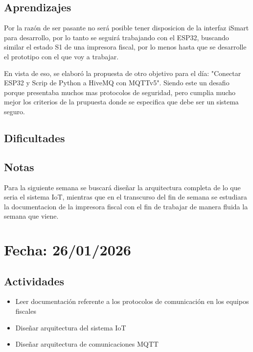 \documentclass[12pt, a4paper]{article}
\begin{document}
    \subsection*{Aprendizajes}

    Por la razón de ser pasante no será posible tener disposicion de la interfaz iSmart para desarrollo, por lo tanto se seguirá trabajando con el ESP32, buscando similar el estado S1 de una impresora fiscal, por lo menos hasta que se desarrolle el prototipo con el que voy a trabajar.

    En vista de eso, se elaboró la propuesta de otro objetivo para el día: "Conectar ESP32 y Scrip de Python a HiveMQ con MQTTv5". Siendo este un desafio porque presentaba muchos mas protocolos de seguridad, pero cumplia mucho mejor los criterios de la prupuesta donde se especifica que debe ser un sistema seguro.

    \subsection*{Dificultades}

    \subsection*{Notas}

    Para la siguiente semana se buscará diseñar la arquitectura completa de lo que seria el sistema IoT, mientras que en el transcurso del fin de semana se estudiara la documentacion de la impresora fiscal con el fin de trabajar de manera fluida la semana que viene.
    
    \section*{Fecha: 26/01/2026}

    \subsection*{Actividades}

    \begin{itemize}
        \item Leer documentación referente a los protocolos de comunicación en los equipos fiscales
        \item Diseñar arquitectura del sistema IoT
        \item Diseñar arquitectura de comunicaciones MQTT
    \end{itemize}
\end{document}

